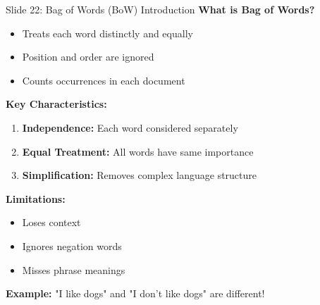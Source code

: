 \documentclass[8pt]{beamer}
\begin{document}
	\begin{frame}{Slide 22: Bag of Words (BoW) Introduction}
		\fontsize{6.5}{7.5}\selectfont
		\textbf{What is Bag of Words?}
		\begin{itemize}
			\item Treats each word distinctly and equally
			\item Position and order are ignored
			\item Counts occurrences in each document
		\end{itemize}
		
		\vspace{0.1cm}
		\textbf{Key Characteristics:}
		\begin{enumerate}
			\item \textbf{Independence:} Each word considered separately
			\item \textbf{Equal Treatment:} All words have same importance
			\item \textbf{Simplification:} Removes complex language structure
		\end{enumerate}
		
		\vspace{0.1cm}
		\textbf{Limitations:}
		\begin{itemize}
			\item Loses context
			\item Ignores negation words
			\item Misses phrase meanings
		\end{itemize}
		
		\textcolor{myblue}{\textbf{Example:}} "I like dogs" and "I don't like dogs" are different!
	\end{frame}
	
\end{document}
